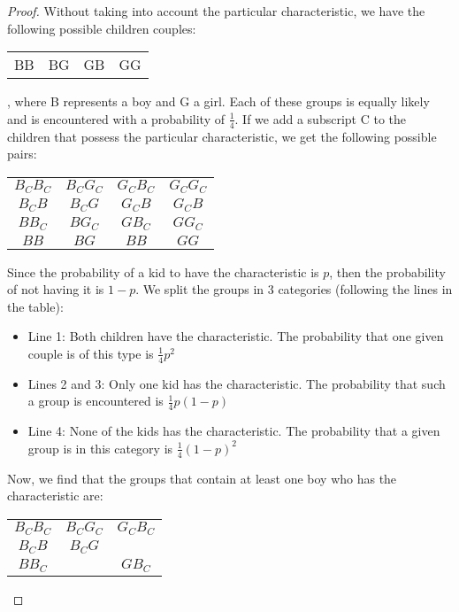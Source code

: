 \begin{proof}
    Without taking into account the particular characteristic, we have the following possible
    children couples:
    
    \begin{table}[h]
        \centering
        \begin{tabular}{c c c c}
            BB & BG & GB & GG
        \end{tabular}
    \end{table}

    , where B represents a boy and G a girl. Each of these groups is equally likely and
    is encountered with a probability of $\frac{1}{4}$. If we add a subscript C to the children
    that possess the particular characteristic, we get the following possible pairs:

    \begin{table}[h]
        \centering
        \begin{tabular}{c c c c}
            $B_CB_C$ & $B_CG_C$ & $G_CB_C$ & $G_CG_C$ \\
            $B_CB$ & $B_CG$ & $G_CB$ & $G_CB$ \\
            $BB_C$ & $BG_C$ & $GB_C$ & $GG_C$ \\
            $BB$ & $BG$ & $BB$ & $GG$
        \end{tabular}
    \end{table}

    Since the probability of a kid to have the characteristic is $p$, then the probability
    of not having it is $1 - p$. We split the groups in 3 categories (following the 
    lines in the table):
    \begin{itemize}
        \item Line 1: Both children have the characteristic. The probability that one
            given couple is of this type is $\frac{1}{4}p^2$
        \item Lines 2 and 3: Only one kid has the characteristic. The probability that such
            a group is encountered is $\frac{1}{4}p(1 - p)$
        \item Line 4: None of the kids has the characteristic. The probability that a given
            group is in this category is $\frac{1}{4}(1 - p)^2$
    \end{itemize}

    \pagebreak

    Now, we find that the groups that contain at least one boy who has the characteristic are:
    \begin{table}[h]
        \centering
        \begin{tabular}{c c c}
            $B_CB_C$ & $B_CG_C$ & $G_CB_C$ \\
            $B_CB$ & $B_CG$ & \\
            $BB_C$ & & $GB_C$ \\
        \end{tabular}
    \end{table}


\end{proof}
